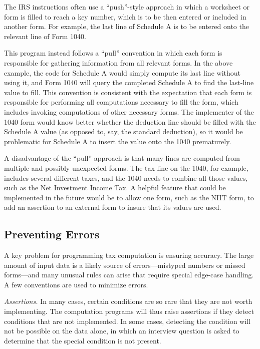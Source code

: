The IRS instructions often use a ``push''-style approach in which a worksheet or
form is filled to reach a key number, which is to be then entered or included in
another form. For example, the last line of Schedule A is to be entered onto the
relevant line of Form 1040.

This program instead follows a ``pull'' convention in which each form is
responsible for gathering information from all relevant forms. In the above
example, the code for Schedule A would simply compute its last line without
using it, and Form 1040 will query the completed Schedule A to find the
last-line value to fill. This convention is consistent with the expectation that
each form is responsible for performing all computations necessary to fill the
form, which includes invoking computations of other necessary forms. The
implementer of the 1040 form would know better whether the deduction line should
be filled with the Schedule A value (as opposed to, say, the standard
deduction), so it would be problematic for Schedule A to insert the value onto
the 1040 prematurely.

A disadvantage of the ``pull'' approach is that many lines are computed from
multiple and possibly unexpected forms. The tax line on the 1040, for example,
includes several different taxes, and the 1040 needs to combine all those
values, such as the Net Investment Income Tax. A helpful feature that could be
implemented in the future would be to allow one form, such as the NIIT form, to
add an assertion to an external form to insure that its values are used.



\subsection{Preventing Errors}

A key problem for programming tax computation is ensuring accuracy. The large
amount of input data is a likely source of errors---mistyped numbers or missed
forms---and many unusual rules can arise that require special edge-case
handling. A few conventions are used to minimize errors.

\emph{Assertions.} In many cases, certain conditions are so rare that they are
not worth implementing. The computation programs will thus raise assertions if
they detect conditions that are not implemented. In some cases, detecting the
condition will not be possible on the data alone, in which an interview question
is asked to determine that the special condition is not present.

